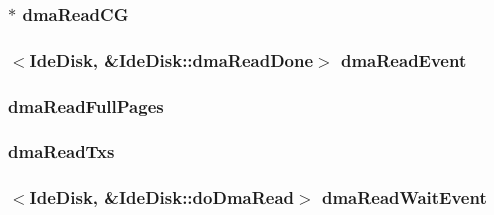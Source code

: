 \label{classIdeDisk_a01f4e9b11f3b49ac1cb6cbb6d51674c2}
\hypertarget{classIdeDisk_aafb836a34095616e67256a58e31ca604}{
\subsubsection[{dmaReadCG}]{$\ast$ {\bf dmaReadCG}}}
\label{classIdeDisk_aafb836a34095616e67256a58e31ca604}
\hypertarget{classIdeDisk_a7c5e1828543bec774a42b971376bb618}{
\subsubsection[{dmaReadEvent}]{$<${\bf IdeDisk}, \&IdeDisk::dmaReadDone$>$ {\bf dmaReadEvent}}}
\label{classIdeDisk_a7c5e1828543bec774a42b971376bb618}
\hypertarget{classIdeDisk_abab6bdef4c30741f3ec4b69e44e9d7c6}{
\subsubsection[{dmaReadFullPages}]{ {\bf dmaReadFullPages}}}
\label{classIdeDisk_abab6bdef4c30741f3ec4b69e44e9d7c6}
\hypertarget{classIdeDisk_a4310d460e8c2b5db635c0b2d1f1887a1}{
\subsubsection[{dmaReadTxs}]{ {\bf dmaReadTxs}}}
\label{classIdeDisk_a4310d460e8c2b5db635c0b2d1f1887a1}
\hypertarget{classIdeDisk_a163b3ebdf005a99628b313b535697fb4}{
\subsubsection[{dmaReadWaitEvent}]{$<${\bf IdeDisk}, \&IdeDisk::doDmaRead$>$ {\bf dmaReadWaitEvent}}}
